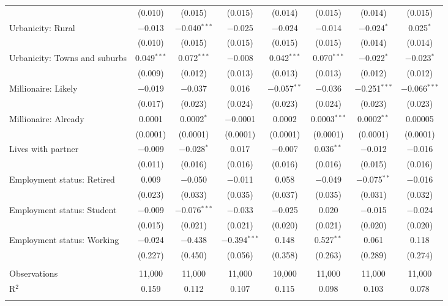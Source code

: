 \begin{tabular}{@{\extracolsep{5pt}}lccccccc}
  & (0.010) & (0.015) & (0.015) & (0.014) & (0.015) & (0.014) & (0.015) \\ 
  Urbanicity: Rural & $-$0.013 & $-$0.040$^{***}$ & $-$0.025 & $-$0.024 & $-$0.014 & $-$0.024$^{*}$ & 0.025$^{*}$ \\ 
  & (0.010) & (0.015) & (0.015) & (0.015) & (0.015) & (0.014) & (0.014) \\ 
  Urbanicity: Towns and suburbs & 0.049$^{***}$ & 0.072$^{***}$ & $-$0.008 & 0.042$^{***}$ & 0.070$^{***}$ & $-$0.022$^{*}$ & $-$0.023$^{*}$ \\ 
  & (0.009) & (0.012) & (0.013) & (0.013) & (0.013) & (0.012) & (0.012) \\ 
  Millionaire: Likely & $-$0.019 & $-$0.037 & 0.016 & $-$0.057$^{**}$ & $-$0.036 & $-$0.251$^{***}$ & $-$0.066$^{***}$ \\ 
  & (0.017) & (0.023) & (0.024) & (0.023) & (0.024) & (0.023) & (0.023) \\ 
  Millionaire: Already & 0.0001 & 0.0002$^{*}$ & $-$0.0001 & 0.0002 & 0.0003$^{***}$ & 0.0002$^{**}$ & 0.00005 \\ 
  & (0.0001) & (0.0001) & (0.0001) & (0.0001) & (0.0001) & (0.0001) & (0.0001) \\ 
  Lives with partner & $-$0.009 & $-$0.028$^{*}$ & 0.017 & $-$0.007 & 0.036$^{**}$ & $-$0.012 & $-$0.016 \\ 
  & (0.011) & (0.016) & (0.016) & (0.016) & (0.016) & (0.015) & (0.016) \\ 
  Employment status: Retired & 0.009 & $-$0.050 & $-$0.011 & 0.058 & $-$0.049 & $-$0.075$^{**}$ & $-$0.016 \\ 
  & (0.023) & (0.033) & (0.035) & (0.037) & (0.035) & (0.031) & (0.032) \\ 
  Employment status: Student & $-$0.009 & $-$0.076$^{***}$ & $-$0.033 & $-$0.025 & 0.020 & $-$0.015 & $-$0.024 \\ 
  & (0.015) & (0.021) & (0.021) & (0.020) & (0.021) & (0.020) & (0.020) \\ 
  Employment status: Working & $-$0.024 & $-$0.438 & $-$0.394$^{***}$ & 0.148 & 0.527$^{**}$ & 0.061 & 0.118 \\ 
  & (0.227) & (0.450) & (0.056) & (0.358) & (0.263) & (0.289) & (0.274) \\ 
 \hline \\[-1.8ex] 

Observations & 11,000 & 11,000 & 11,000 & 10,000 & 11,000 & 11,000 & 11,000 \\ 
R$^{2}$ & 0.159 & 0.112 & 0.107 & 0.115 & 0.098 & 0.103 & 0.078 \\ 
\hline 
\hline \\[-1.8ex] 
\end{tabular} 